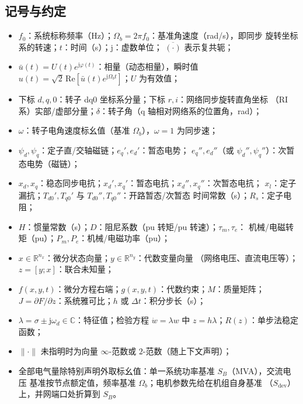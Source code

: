 \subsection{记号与约定}
\begin{itemize}
  \item $f_0$：系统标称频率（Hz）；$\Omega_b=2\pi f_0$：基准角速度（rad/s），即同步
        旋转坐标系的转速；$t$：时间（s）；$\mathrm j$：虚数单位；
        $\overline{(\cdot)}$ 表示复共轭；
  \item $\bar u(t)=U(t)e^{\mathrm j\varphi(t)}$：相量（动态相量），瞬时值
        $u(t)=\sqrt2\,\mathrm{Re}[\bar u(t)e^{\mathrm j\Omega_b t}]$；$U$ 为有效值；
  \item 下标 $d,q,0$：转子 dq0 坐标系分量；下标 $r,i$：网络同步旋转直角坐标
        （RI 系）实部/虚部分量；$\delta$：转子角（q 轴相对网络系的位置角，rad）；
  \item $\omega$：转子电角速度标幺值（基准 $\Omega_b$），$\omega=1$ 为同步速；
  \item $\psi_d,\psi_q$：定子直/交轴磁链；$e_q',e_d'$：暂态电势；
        $e_q'',e_d''$（或 $\psi_d'',\psi_q''$）：次暂态电势（磁链）；
  \item $x_d,x_q$：稳态同步电抗；$x_d',x_q'$：暂态电抗；$x_d'',x_q''$：次暂态电抗；
        $x_l$：定子漏抗；$T_{d0}',T_{q0}'$ 与 $T_{d0}'',T_{q0}''$：开路暂态/次暂态
        时间常数（s）；$R_s$：定子电阻；
  \item $H$：惯量常数（s）；$D$：阻尼系数（pu 转矩/pu 转速）；$\tau_m,\tau_e$：
        机械/电磁转矩（pu）；$P_m,P_e$：机械/电磁功率（pu）；
  \item $x\in\mathbb R^{n_x}$：微分状态向量；$y\in\mathbb R^{n_y}$：代数变量向量
        （网络电压、直流电压等）；$z=[y;x]$：联合未知量；
  \item $f(x,y,t)$：微分方程右端；$g(x,y,t)$：代数约束；$M$：质量矩阵；
        $J=\partial F/\partial z$：系统雅可比；$h$ 或 $\Delta t$：积分步长（s）；
  \item $\lambda=\sigma\pm\mathrm j\omega_d\in\mathbb C$：特征值；检验方程
        $\dot w=\lambda w$ 中 $z=h\lambda$；$R(z)$：单步法稳定函数；
  \item $\lVert\cdot\rVert$ 未指明时为向量 $\infty$-范数或 $2$-范数（随上下文声明）；
  \item 全部电气量除特别声明外取标幺值：单一系统功率基准 $S_B$（MVA），交流电压
        基准按节点额定值，频率基准 $\Omega_b$；电机参数先给在机组自身基准
        （$S_{\mathrm{dev}}$）上，并网端口处折算到 $S_B$。
\end{itemize}


